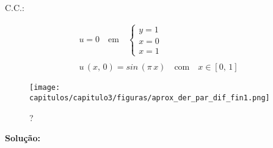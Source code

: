 C.C.:

\[
\begin{array}{l}
 u = 0 \quad \mbox{em} \quad
 \left\{
 \begin{array}{l}
  y = 1 \\
  x = 0 \\
  x = 1
 \end{array} \right. \\
 \\
 u\,(x,\,0) = sin\,(\pi \, x) \quad \mbox{com} \quad x \in [0,\,1]
\end{array}
\]

\begin{figure}[htb]
 \centering
 \texttt{[image: capitulos/capitulo3/figuras/aprox\_der\_par\_dif\_fin1.png]}
 \caption{?}
 \label{fig:aprox_der_par_dif_fin1}
\end{figure}

\textbf{Solução:}

